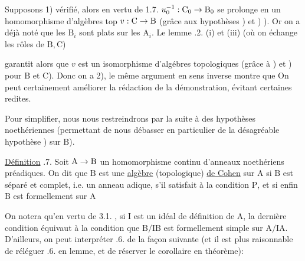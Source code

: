 Supposons 1) vérifié, alors en vertu de 1.7. $u_0^{-1}:\mathrm C_0\to\mathrm B_0$ se prolonge en un homomorphisme d'algèbres top $v:\mathrm C\to\mathrm B$ (grâce aux hypothèses ) et ) ). Or on a déjà noté que les $\mathrm B_i$ sont plats sur les $\mathrm A_i$. Le lemme .2. (i) et (iii) (où on échange les rôles de $\mathrm B,\mathrm C$)

garantit alors que $v$ est un isomorphisme d'algébres topologiques (grâce à ) et ) pour $\mathrm B$ et $\mathrm C$). Donc  on a 2),   le même argument en sens inverse montre que   On peut certainement améliorer la rédaction de la démonstration, évitant certaines redites.

Pour simplifier, nous nous restreindrons par la suite à des hypothèses noethériennes (permettant de nous débasser en particulier de la désagréable hypothèse ) sur $\mathrm B$).

\uline{Définition} .7. Soit $\mathrm A\to\mathrm B$ un homomorphisme continu d'anneaux noethériens préadiques. On dit que $\mathrm B$ est une \uline{algèbre} (topologique) \uline{de Cohen} sur $\mathrm A$ si  $\mathrm B$ est séparé et complet, i.e.  un anneau adique,  s'il satisfait à la condition $\mathrm P$, et si enfin  $\mathrm B$ est formellement  sur $\mathrm A$ 

On notera qu'en vertu de 3.1. , si $\mathrm I$ est un idéal de définition de $\mathrm A$, la dernière condition équivaut à la condition que $\mathrm B/\mathrm{IB}$ est formellement simple sur $\mathrm A/\mathrm{IA}$. D'ailleurs, on peut interpréter .6. de la façon suivante (et il est  plus raisonnable de réléguer .6. en lemme, et de réserver le corollaire en théorème):

